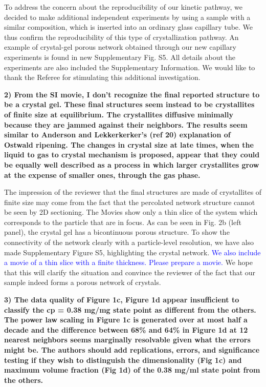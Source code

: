 \documentclass[11pt,a4paper]{article}
\newenvironment{referee}%
{\bigskip\singlespacing\bf}%
{\par\bigskip}
\begin{document}
To address the concern about the reproducibility of our kinetic pathway, we decided to make additional independent experiments
by using a sample with a similar composition, which is inserted into an ordinary glass capillary tube. We thus confirm the reproducibility of this type of crystallization pathway. An example of crystal-gel porous  network obtained through our new capillary experiments is found in new Supplementary Fig. S5. All details about the experiments are also included the Supplementary Information. We would like to thank the Referee for stimulating this additional investigation.


\begin{referee}
2) From the SI movie, I don't recognize the final reported structure to be a crystal gel. These final structures seem instead to be crystallites of finite size at equilibrium. The crystallites diffusive minimally because they are jammed against their neighbors. The results seem similar to Anderson and Lekkerkerker's (ref 20) explanation of Ostwald ripening. The changes in crystal size at late times, when the liquid to gas to crystal mechanism is proposed, appear that they could be equally well described as a process in which larger crystallites grow at the expense of smaller ones, through the gas phase.
\end{referee}

The impression of the reviewer that the final structures are made of crystallites of finite size may come from the fact that the percolated network structure cannot be seen by 2D sectioning. The Movies show only a thin slice of the system which corresponds to the particle that are in focus. 
As can be seen in Fig. 2b (left panel), the crystal gel has a bicontinuous porous structure. 
To show the connectivity of the network clearly with a particle-level resolution, we have also made Supplementary Figure S5, highlighting the crystal network. 
\textcolor{blue}{We also include a movie of a thin slice with a finite thickness. Please prepare a movie.} 
We hope that this will clarify the situation and convince the reviewer of the fact that our sample indeed forms a porous network of crystals. 


\begin{referee}
3) The data quality of Figure 1c, Figure 1d appear insufficient to classify the cp = 0.38 mg/mg state point as different from the others. The power law scaling in Figure 1c is generated over at most half a decade and the difference between 68\% and 64\% in Figure 1d at 12 nearest neighbors seems marginally resolvable given what the errors might be. The authors should add replications, errors, and significance testing if they wish to distinguish the dimensionality (Fig 1c) and maximum volume fraction (Fig 1d) of the 0.38 mg/ml state point from the others.
\end{referee}
\end{document}
